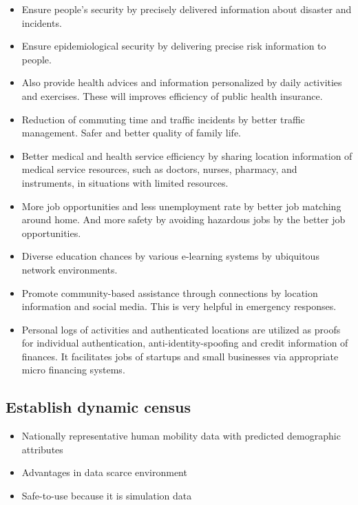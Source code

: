 \begin{itemize}

\item Ensure people’s security by precisely delivered information about disaster and incidents.

\item Ensure epidemiological security by delivering precise risk information to people. 

\item Also provide health advices and information personalized by daily activities and exercises. These will improves efficiency of public health insurance.

\item Reduction of commuting time and traffic incidents by better traffic management. Safer and better quality of family life.

\item Better medical and health service efficiency by sharing location information of medical service resources, such as doctors, nurses, pharmacy, and instruments, in situations with limited resources.

\item More job opportunities and less unemployment rate by better job matching around home. And more safety by avoiding hazardous jobs by the better job opportunities.

\item Diverse education chances by various e-learning systems by ubiquitous network environments.

\item Promote community-based assistance through connections by location information and social media. This is very helpful in emergency responses.

\item Personal logs of activities and authenticated locations are utilized as proofs for individual authentication, anti-identity-spoofing and credit information of finances. It facilitates jobs of startups and small businesses via appropriate micro financing systems.

\end{itemize}


\subsection{Establish dynamic census}

\begin{itemize}

\item Nationally representative human mobility data with predicted demographic attributes

\item Advantages in data scarce environment

\item Safe-to-use because it is simulation data

\end{itemize}

